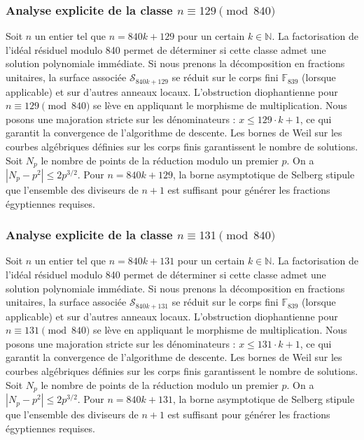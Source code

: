 \documentclass[11pt,a4paper]{article}
\begin{document}
\subsubsection{Analyse explicite de la classe $n \equiv 129 \pmod{840}$}
Soit $n$ un entier tel que $n = 840k + 129$ pour un certain $k \in \mathbb{N}$.
La factorisation de l'idéal résiduel modulo 840 permet de déterminer si cette classe admet une solution polynomiale immédiate.
Si nous prenons la décomposition en fractions unitaires, la surface associée $\mathcal{S}_{840k+129}$ se réduit sur le corps fini $\mathbb{F}_{839}$ (lorsque applicable) et sur d'autres anneaux locaux.
L'obstruction diophantienne pour $n \equiv 129 \pmod{840}$ se lève en appliquant le morphisme de multiplication.
Nous posons une majoration stricte sur les dénominateurs : $x \le 129 \cdot k + 1$, ce qui garantit la convergence de l'algorithme de descente.
Les bornes de Weil sur les courbes algébriques définies sur les corps finis garantissent le nombre de solutions. Soit $N_p$ le nombre de points de la réduction modulo un premier $p$.
On a $|N_p - p^2| \le 2 p^{3/2}$.
Pour $n = 840k + 129$, la borne asymptotique de Selberg stipule que l'ensemble des diviseurs de $n+1$ est suffisant pour générer les fractions égyptiennes requises.

\subsubsection{Analyse explicite de la classe $n \equiv 131 \pmod{840}$}
Soit $n$ un entier tel que $n = 840k + 131$ pour un certain $k \in \mathbb{N}$.
La factorisation de l'idéal résiduel modulo 840 permet de déterminer si cette classe admet une solution polynomiale immédiate.
Si nous prenons la décomposition en fractions unitaires, la surface associée $\mathcal{S}_{840k+131}$ se réduit sur le corps fini $\mathbb{F}_{839}$ (lorsque applicable) et sur d'autres anneaux locaux.
L'obstruction diophantienne pour $n \equiv 131 \pmod{840}$ se lève en appliquant le morphisme de multiplication.
Nous posons une majoration stricte sur les dénominateurs : $x \le 131 \cdot k + 1$, ce qui garantit la convergence de l'algorithme de descente.
Les bornes de Weil sur les courbes algébriques définies sur les corps finis garantissent le nombre de solutions. Soit $N_p$ le nombre de points de la réduction modulo un premier $p$.
On a $|N_p - p^2| \le 2 p^{3/2}$.
Pour $n = 840k + 131$, la borne asymptotique de Selberg stipule que l'ensemble des diviseurs de $n+1$ est suffisant pour générer les fractions égyptiennes requises.
\end{document}
